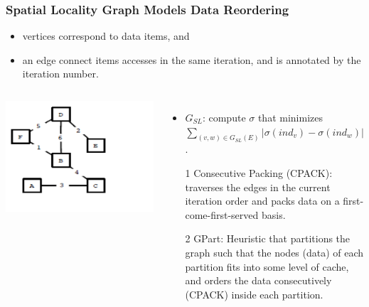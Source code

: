 \documentclass{beamer}
\newcommand{\emp}[1]{\textcolor{DikuRed}{ #1}}
\begin{document}
\begin{frame}[fragile,t]
  \frametitle{Spatial Locality Graph Models Data Reordering}

\begin{itemize}
    \item vertices correspond to data items, and 
    \item an edge connect items accesses in the same 
            iteration, and is annotated by the iteration
            number.
\end  {itemize}

\begin{columns}
\includegraphics[width=44ex]{Figures/SpatLocGraph}
\begin{itemize}
\item $G_{SL}$: compute $\sigma$ that minimizes
        $\sum_{(v,w)\in G_{SL}(E)} |\sigma(ind_v)-\sigma(ind_w)|$.
\item[1] \emp{Consecutive Packing (CPACK)}: traverses
            the edges in the current iteration order
            and packs data on a first-come-first-served basis.\smallskip


\item[2] \emp{GPart}: Heuristic that partitions the 
            graph such that the nodes (data) of each partition 
            fits into some level
            of cache, and orders the data consecutively (CPACK) inside
            each partition.
\end{itemize}
\end{columns}

 
\end{frame}
\end{document}
